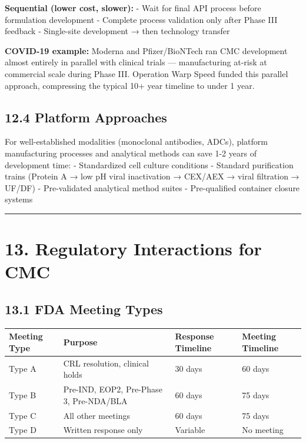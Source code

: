 \documentclass[
  11pt,
  a4paper,
]{report}
\begin{document}
\textbf{Sequential (lower cost, slower):} - Wait for final API process
before formulation development - Complete process validation only after
Phase III feedback - Single-site development → then technology transfer

\textbf{COVID-19 example:} Moderna and Pfizer/BioNTech ran CMC
development almost entirely in parallel with clinical trials ---
manufacturing at-risk at commercial scale during Phase III. Operation
Warp Speed funded this parallel approach, compressing the typical 10+
year timeline to under 1 year.

\hypertarget{platform-approaches}{%
\subsection{12.4 Platform Approaches}\label{platform-approaches}}

For well-established modalities (monoclonal antibodies, ADCs), platform
manufacturing processes and analytical methods can save 1-2 years of
development time: - Standardized cell culture conditions - Standard
purification trains (Protein A → low pH viral inactivation → CEX/AEX →
viral filtration → UF/DF) - Pre-validated analytical method suites -
Pre-qualified container closure systems

\begin{center}\rule{0.5\linewidth}{0.5pt}\end{center}

\hypertarget{regulatory-interactions-for-cmc}{%
\section{13. Regulatory Interactions for
CMC}\label{regulatory-interactions-for-cmc}}

\hypertarget{fda-meeting-types}{%
\subsection{13.1 FDA Meeting Types}\label{fda-meeting-types}}

\begin{longtable}[]{@{}llll@{}}
\toprule
Meeting Type & Purpose & Response Timeline & Meeting
Timeline\tabularnewline
\midrule
\endhead
Type A & CRL resolution, clinical holds & 30 days & 60
days\tabularnewline
Type B & Pre-IND, EOP2, Pre-Phase 3, Pre-NDA/BLA & 60 days & 75
days\tabularnewline
Type C & All other meetings & 60 days & 75 days\tabularnewline
Type D & Written response only & Variable & No meeting\tabularnewline
\bottomrule
\end{longtable}
\end{document}
